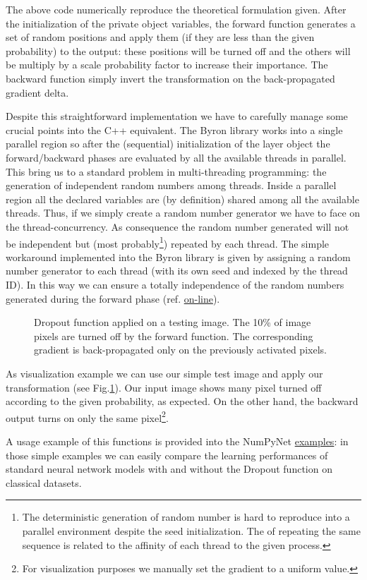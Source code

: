 \documentclass{standalone}
\begin{document}
The above code numerically reproduce the theoretical formulation given.
After the initialization of the private object variables, the forward function generates a set of random positions and apply them (if they are less than the given probability) to the output: these positions will be turned off and the others will be multiply by a scale probability factor to increase their importance.
The backward function simply invert the transformation on the back-propagated gradient \textsf{delta}.

Despite this straightforward implementation we have to carefully manage some crucial points into the \textsf{C++} equivalent.
The \textsf{Byron} library works into a single parallel region so after the (sequential) initialization of the layer object the forward/backward phases are evaluated by all the available threads in parallel.
This bring us to a standard problem in multi-threading programming: the generation of independent random numbers among threads.
Inside a parallel region all the declared variables are (by definition) shared among all the available threads.
Thus, if we simply create a random number generator we have to face on the thread-concurrency.
As consequence the random number generated will not be independent but (most probably\footnote{
  The deterministic generation of random number is hard to reproduce into a parallel environment despite the seed initialization.
  The  of repeating the same sequence is related to the affinity of each thread to the given process.
}) repeated by each thread.
The simple workaround implemented into the \textsf{Byron} library is given by assigning a random number generator to each thread (with its own seed and indexed by the thread ID).
In this way we can ensure a totally independence of the random numbers generated during the forward phase (ref. \href{https://github.com/Nico-Curti/Byron/blob/master/src/dropout_layer.cpp}{on-line}).

\begin{figure}[htbp]
\centering
\def\svgwidth{0.8\textwidth}

\caption{Dropout function applied on a testing image.
The 10\% of image pixels are turned off by the forward function.
The corresponding gradient is back-propagated only on the previously activated pixels.
}
\label{fig:dropout}
\end{figure}

As visualization example we can use our simple test image and apply our transformation (see Fig.\ref{fig:dropout}).
Our input image shows many pixel turned off according to the given probability, as expected.
On the other hand, the backward output turns on only the same pixel\footnote{
  For visualization purposes we manually set the gradient to a uniform value.
}.

A usage example of this functions is provided into the \textsf{NumPyNet} \href{https://github.com/Nico-Curti/NumPyNet/tree/master/examples}{examples}: in those simple examples we can easily compare the learning performances of standard neural network models with and without the Dropout function on classical datasets.
\end{document}
